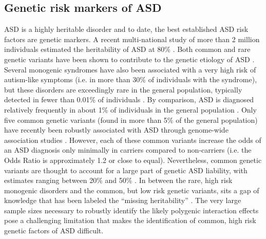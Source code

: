 \documentclass[9pt,lineno]{elife}
\begin{document}
\subsection{Genetic risk markers of ASD}
ASD is a highly heritable disorder and to date, the best established ASD risk factors are genetic markers. A recent multi-national study of more than 2 million individuals estimated the heritability of ASD at 80\% \citep{Bai2019-hb}. Both common \citep[e.g. Single-nucleotide polymorphism, SNP, ][]{Grove2019-vz} and rare genetic variants \citep[e.g. recurrent Copy-number variant, CNV, ][]{Sanders2019-wi} have been shown to contribute to the genetic etiology of ASD \citep{Geschwind2015-ss}. Several monogenic syndromes have also been associated with a very high risk of autism-like symptoms (i.e. in more than 30\% of individuals with the syndrome), but these disorders are exceedingly rare in the general population, typically detected in fewer than 0.01\% of individuals \citep{De_la_Torre-Ubieta2016-fw}. By comparison, ASD is diagnosed relatively frequently in about 1\% of individuals in the general population \citep{Bai2019-hb}. Only five common genetic variants (found in more than 5\% of the general population) have recently been robustly associated with ASD through genome-wide association studies \citep{Grove2019-vz}. However, each of these common variants increase the odds of an ASD diagnosis only minimally in carriers compared to non-carriers (i.e. the Odds Ratio is approximately 1.2 or close to equal). Nevertheless, common genetic variants are thought to account for a large part of genetic ASD liability, with estimates ranging between 20\% \citep{Robinson2016-dd} and 50\% \citep{Gaugler2014-vi}. In between the rare, high risk monogenic disorders and the common, but low risk genetic variants, sits a gap of knowledge that has been labeled the “missing heritability” \citep{Manolio2009-sr,Maher2008-dz}. The very large sample sizes necessary \citep{Khera2018-of} to robustly identify the likely polygenic interaction effects \citep{OConnor2019-wp} pose a challenging limitation that makes the identification of common, high risk genetic factors of ASD difficult.
\end{document}
